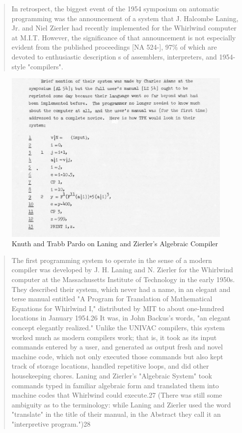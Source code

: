 \begin{quotation}
In retrospect, the biggest event of the 1954 symposium on automatic programming 
was the announcement of a system that J. Halcombe Laning, Jr. and Niel Zierler 
had recently implemented for the Whirlwind computer at M.I.T.  However, the 
significance of that announcement is not especially evident from the published 
proceedings [NA 524-], 97\% of which are devoted to enthusiastic description s 
of assemblers, interpreters, and 1954-style "compilers".
\cite{Knuth_TrabbPardo_1976_Early_Development}
\end{quotation}

\begin{figure}[h!]
    \centering
    \includegraphics[width=0.5\linewidth]{resource/knuth_pardo_on_laning_zierlers_algebraic_compiler.png}
    \caption{Knuth and Trabb Pardo on Laning and Zierler's Algebraic Compiler}
    \label{fig:knuth-pardo-on-laning-zierler}
\end{figure}

\begin{quotation}
The first programming system to operate in the sense of a modern compiler was 
developed by J. H. Laning and N. Zierler for the Whirlwind computer at the 
Massachusetts Institute of Technology in the early 1950s. They described their 
system, which never had a name, in an elegant and terse manual entitled "A 
Program for Translation of Mathematical Equations for Whirlwind I," distributed 
by MIT to about one-hundred locations in January 1954.26 It was, in John 
Backus's words, "an elegant concept elegantly realized." Unlike the UNIVAC 
compilers, this system worked much as modern compilers work; that is, it took 
as its input commands entered by a user, and generated as output fresh and 
novel machine code, which not only executed those commands but also kept track 
of storage locations, handled repetitive loops, and did other housekeeping 
chores. Laning and Zierler's "Algebraic System" took commands typed in familiar 
algebraic form and translated them into machine codes that Whirlwind could 
execute.27 (There was still some ambiguity as to the terminology: while Laning 
and Zierler used the word "translate" in the title of their manual, in the 
Abstract they call it an "interpretive program.")28
\cite{new-history-of-modern-computing}
\end{quotation}

